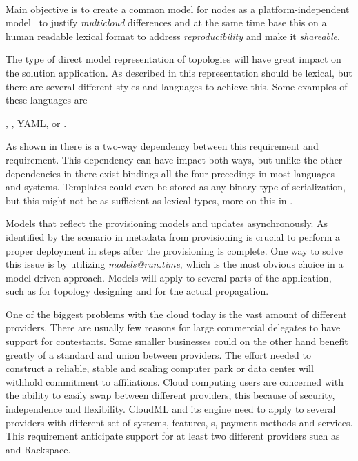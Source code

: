  \\
Main objective is to create a common model for nodes as a platform-independent 
model~\cite{agile:cuong10} to justify \emph{multicloud} differences and 
at the same time base this on a human readable lexical format to address \emph{reproducibility} and
make it \emph{shareable}.

The type of direct model representation of topologies will have great impact 
on the solution application.
As described in  this representation should be lexical,
but there are several different styles and languages to achieve this.
Some examples of these languages are 
\begin{ii}
  \iitem {},
  \iitem {},
  \iitem YAML,
  \iitem {} or
  \iitem {}.
\end{ii}
As shown in  there is a two-way dependency between 
this requirement and  requirement.
This dependency can have impact both ways, but unlike the other dependencies in
 there exist bindings all the four precedings in
most languages and systems.
Templates could even be stored as any binary type of serialization, 
but this might not be as sufficient as lexical types, more on this
in .


Models that reflect the provisioning models and updates asynchronously. 
As identified by the scenario in  metadata from provisioning is crucial to perform
a proper deployment in steps after the provisioning is complete.
One way to solve this issue is by utilizing \emph{models@run.time}, which is the most obvious choice in a
model-driven approach.
Models will apply to several parts of the application, such as for topology designing and for the actual propagation.

One of the biggest problems with the cloud today is the vast amount of different providers. 
There are usually few reasons for large commercial delegates to have support for contestants. 
Some smaller businesses could on the other hand benefit greatly of a standard and union 
between providers.
The effort needed to construct a reliable, stable and scaling computer park or data center will 
withhold commitment to affiliations. 
Cloud computing users are concerned with the ability to easily swap between different providers, 
this because of security, 
independence and flexibility. 
CloudML and its engine need to apply to several providers with different set of systems, 
features, s, payment methods and services. 
This requirement anticipate support for at least two different providers such as  and Rackspace.

